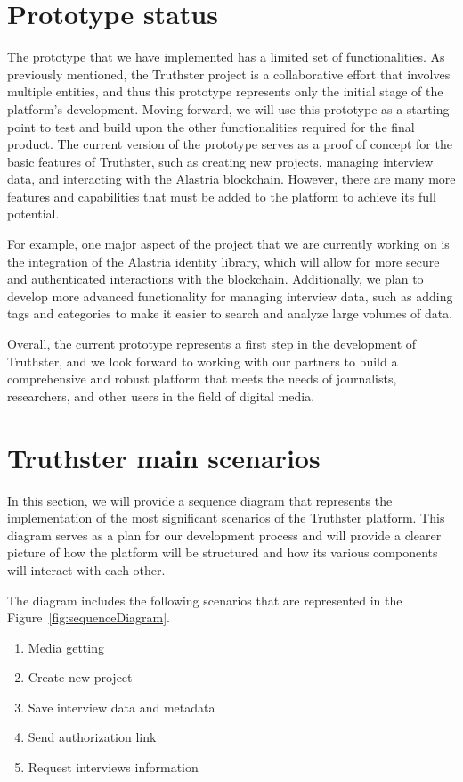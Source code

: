 \documentclass[target=mst,aauheader=]{thud}
\begin{document}
\section{Prototype status}

The prototype that we have implemented has a limited set of functionalities. As previously mentioned, the Truthster project is a collaborative effort that involves multiple entities, and thus this prototype represents only the initial stage of the platform's development. Moving forward, we will use this prototype as a starting point to test and build upon the other functionalities required for the final product.
The current version of the prototype serves as a proof of concept for the basic features of Truthster, such as creating new projects, managing interview data, and interacting with the Alastria blockchain. However, there are many more features and capabilities that must be added to the platform to achieve its full potential.\par
For example, one major aspect of the project that we are currently working on is the integration of the Alastria identity library, which will allow for more secure and authenticated interactions with the blockchain. Additionally, we plan to develop more advanced functionality for managing interview data, such as adding tags and categories to make it easier to search and analyze large volumes of data.\par
Overall, the current prototype represents a first step in the development of Truthster, and we look forward to working with our partners to build a comprehensive and robust platform that meets the needs of journalists, researchers, and other users in the field of digital media.

\section{Truthster main scenarios}

In this section, we will provide a sequence diagram that represents the implementation of the most significant scenarios of the Truthster platform. This diagram serves as a plan for our development process and will provide a clearer picture of how the platform will be structured and how its various components will interact with each other.\par
The diagram includes the following scenarios that are represented in the Figure~\ref{fig:sequenceDiagram}.

\begin{enumerate}

    \item Media getting
    \item Create new project
    \item Save interview data and metadata
    \item Send authorization link
    \item Request interviews information

\end{enumerate}
\end{document}
